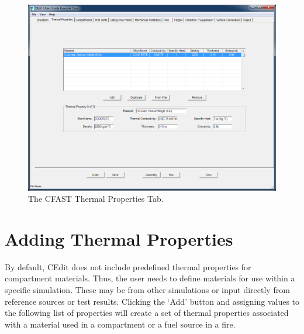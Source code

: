 \begin{figure}[ht]
\centering
\includegraphics[width=6.5in]{FIGURES/Thermal_Properties_tab}
\caption[The CFAST Thermal Properties Tab]{The CFAST Thermal Properties Tab.}
\end{figure}

\section{Adding Thermal Properties}

By default, CEdit does not include predefined thermal properties for compartment materials. Thus, the user needs to define materials for use within a specific simulation. These may be from other simulations or input directly from reference sources or test results. Clicking the `Add' button and assigning values to the following list of properties will create a set of thermal properties associated with a material used in a compartment or a fuel source in a fire.


